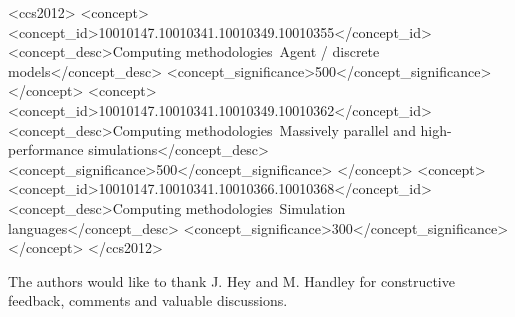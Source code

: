 \documentclass[format=acmsmall, review=true, screen=true]{acmart}
\begin{document}
%
%
\begin{CCSXML}
<ccs2012>
<concept>
<concept_id>10010147.10010341.10010349.10010355</concept_id>
<concept_desc>Computing methodologies~Agent / discrete models</concept_desc>
<concept_significance>500</concept_significance>
</concept>
<concept>
<concept_id>10010147.10010341.10010349.10010362</concept_id>
<concept_desc>Computing methodologies~Massively parallel and high-performance simulations</concept_desc>
<concept_significance>500</concept_significance>
</concept>
<concept>
<concept_id>10010147.10010341.10010366.10010368</concept_id>
<concept_desc>Computing methodologies~Simulation languages</concept_desc>
<concept_significance>300</concept_significance>
</concept>
</ccs2012>
\end{CCSXML}



\maketitle



%













\begin{acks}
The authors would like to thank J. Hey and M. Handley for constructive feedback, comments and valuable discussions.
\end{acks}



\end{document}
